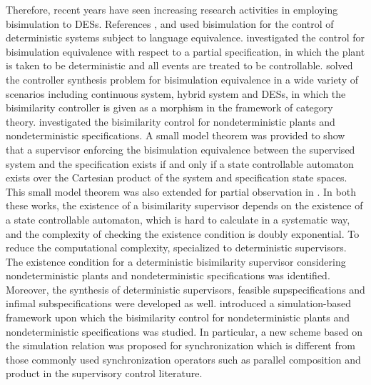 \documentclass[preprint,authoryear,12pt]{elsarticle}
\begin{document}
Therefore, recent years have seen increasing research activities
in employing bisimulation to DESs. References
\citep{barrett1998bisimulation}, \citep{komenda2005control} and
\citep{sumodel} used bisimulation for the control of deterministic
systems subject to language equivalence.
\cite{madhusudan2002branching} investigated the control for
bisimulation equivalence with respect to a partial specification,
in which the plant is taken to be deterministic and all events are
treated to be controllable. \cite{tabuada2008controller} solved
the controller synthesis problem for bisimulation equivalence in a
wide variety of scenarios including continuous system, hybrid
system and DESs, in which the bisimilarity controller is given as
a morphism in the framework of category theory.
\cite{zhou2006control} investigated the bisimilarity control for
nondeterministic plants and nondeterministic specifications. A
small model theorem was provided to show that a supervisor
enforcing the bisimulation equivalence between the supervised
system and the specification exists if and only if a state
controllable automaton exists over the Cartesian product of the
system and specification state spaces. This small model theorem
was also extended for partial observation in
\citep{zhou2007small}. In both these works, the existence of a
bisimilarity supervisor depends on the existence of a state
controllable automaton, which is hard to calculate in a systematic
way, and the complexity of checking the existence condition is
doubly exponential. To reduce the computational complexity,
\cite{zhoubisimilarity2011} specialized to deterministic
supervisors. The existence condition for a deterministic
bisimilarity supervisor considering nondeterministic plants and
nondeterministic specifications was identified. Moreover, the
synthesis of deterministic supervisors, feasible supspecifications
and infimal subspecifications were developed as well.
\cite{liu2011bisimilarity} introduced a simulation-based framework
upon which the bisimilarity control for nondeterministic plants
and nondeterministic specifications was studied. In particular, a
new scheme based on the simulation relation was proposed for
synchronization which is different from those commonly used
synchronization operators such as parallel composition and product
in the supervisory control literature.
\end{document}
